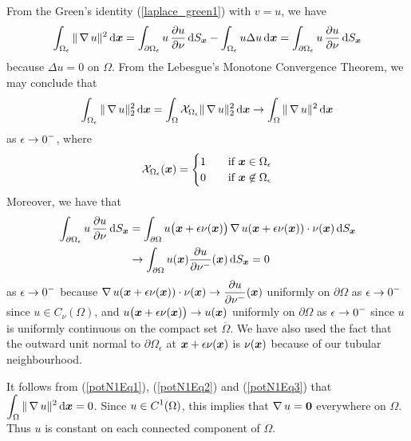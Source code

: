 From the Green's identity (\ref{laplace_green1}) with $v=u$, we have
\begin{equation} \label{potN1Eq1}
\int_{\Omega_\epsilon} \| \operatorname{\nabla} u \|^2 \,\mathrm{d}{{\bm{x}}} =
\int_{\partial \Omega_\epsilon} u\,\frac{\partial{u}}{\partial \nu} \,\mathrm{d}{S}_{{\bm{x}}}
- \int_{\Omega_\epsilon} u \Delta u \,\mathrm{d}{{\bm{x}}}  =
\int_{\partial \Omega_\epsilon} u\,\frac{\partial{u}}{\partial \nu} \,\mathrm{d}{S}_{{\bm{x}}}
\end{equation}
because $\Delta u = 0$ on $\Omega$.  From the Lebesgue's Monotone
Convergence Theorem, we may conclude that
\begin{equation} \label{potN1Eq2}
\int_{\Omega_\epsilon} \| \operatorname{\nabla} u \|_2^2 \,\mathrm{d}{{\bm{x}}}
= \int_\Omega \mathcal{X}_{\Omega_\epsilon} \| \operatorname{\nabla} u \|_2^2 \,\mathrm{d}{{\bm{x}}}
\rightarrow \int_\Omega \| \operatorname{\nabla} u \|^2 \,\mathrm{d}{{\bm{x}}}
\end{equation}
as $\displaystyle \epsilon \rightarrow 0^-$,  where
\[
\mathcal{X}_{\Omega_\epsilon}({\bm{x}}) =
\begin{cases}
1 & \quad \text{if} \ {\bm{x}} \in \Omega_\epsilon \\
0 & \quad \text{if} \ {\bm{x}} \not\in \Omega_\epsilon
\end{cases}
\]
Moreover, we have that
\begin{equation} \label{potN1Eq3}
\begin{split}
\int_{\partial \Omega_\epsilon} u\,\frac{\partial{u}}{\partial \nu} \,\mathrm{d}{S}_{{\bm{x}}}
&= \int_{\partial \Omega} u\big({\bm{x}} + \epsilon \nu({\bm{x}})\big)
\operatorname{\nabla} u({\bm{x}} + \epsilon \nu({\bm{x}})) \cdot \nu({\bm{x}}) 
\,\mathrm{d}{S}_{{\bm{x}}} \\
&\rightarrow \int_{\partial \Omega} u({\bm{x}}) \frac{\partial{u}}{\partial \nu^-}({\bm{x}})
\,\mathrm{d}{S}_{{\bm{x}}} = 0
\end{split}
\end{equation}
as $\displaystyle \epsilon \rightarrow 0^-$ because
$\displaystyle \operatorname{\nabla} u({\bm{x}} + \epsilon \nu({\bm{x}})) \cdot \nu({\bm{x}})
\to \frac{\partial{u}}{\partial \nu^-}({\bm{x}})$ uniformly on $\partial \Omega$ as
$\displaystyle \epsilon \to 0^-$ since $u \in C_{\nu}(\Omega)$, and
$\displaystyle u\big({\bm{x}} + \epsilon \nu({\bm{x}})\big) \to
u({\bm{x}})$ uniformly on $\partial \Omega$ as $\displaystyle \epsilon \to 0^-$
since $u$ is uniformly continuous on the compact set $\overline{\Omega}$.
We have also used the fact that the outward unit normal to
$\partial \Omega_\epsilon$ at
${\bm{x}} + \epsilon \nu({\bm{x}})$ is $\nu({\bm{x}})$
because of our tubular neighbourhood.

It follows from (\ref{potN1Eq1}), (\ref{potN1Eq2}) and (\ref{potN1Eq3})
that $\displaystyle \int_\Omega \| \operatorname{\nabla} u \|^2 \,\mathrm{d}{{\bm{x}}} = 0$.
Since $\displaystyle u \in C^1(\Omega)$, this implies that $\operatorname{\nabla} u = {\bm{0}}$
everywhere on $\Omega$.  Thus $u$ is constant on each connected
component of $\Omega$.

